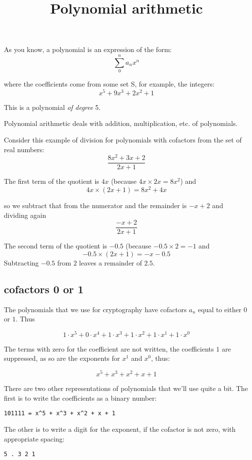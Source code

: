 \documentclass[11pt, oneside]{article}
\title{Polynomial arithmetic}
\date{}
\begin{document}
\maketitle
\Large

As you know, a polynomial is an expression of the form:
\[ \sum_0^n a_n x^n \]

where the coefficients come from some set S, for example, the integers:
\[ x^5 + 9x^3 + 2x^2 + 1 \]

This is a polynomial \emph{of degree} 5.

Polynomial arithmetic deals with addition, multiplication, etc. of polynomials.

Consider this example of division for polynomials with cofactors from the set of real numbers:
\[ \frac{8x^2 + 3x + 2 }{2x + 1} \]

The first term of the quotient is $4x$ (because $4x \times 2x = 8x^2$) and 
\[ 4x \times (2x+1) = 8x^2 + 4x \]

so we subtract that from the numerator and the remainder is $-x + 2$ and dividing again
\[ \frac{-x + 2}{2x + 1} \]

The second term of the quotient is $-0.5$ (because $-0.5 \times 2 = -1$ and
\[ -0.5 \times (2x + 1) = -x - 0.5 \]
Subtracting $-0.5$ from $2$ leaves a remainder of $2.5$.

\subsection*{cofactors 0 or 1}

The polynomials that we use for cryptography have cofactors $a_n$ equal to either $0$ or $1$.  Thus

\[ 1 \cdot x^5 + 0 \cdot x^4 + 1 \cdot x^3 + 1 \cdot x^2 + 1\cdot x^1 + 1 \cdot x^0 \]

The terms with zero for the coefficient are not written, the coefficients $1$ are suppressed, as so are the exponents for $x^1$ and $x^0$, thus:

\[  x^5 + x^3 + x^2 +  x + 1 \]

There are two other representations of polynomials that we'll use quite a bit.  The first is to write the coefficients as a binary number:
\begin{verbatim}
101111 = x^5 + x^3 + x^2 + x + 1
\end{verbatim}

The other is to write a digit for the exponent, if the cofactor is not zero, with appropriate spacing:
\begin{verbatim}
5 . 3 2 1
\end{verbatim}
\end{document}
